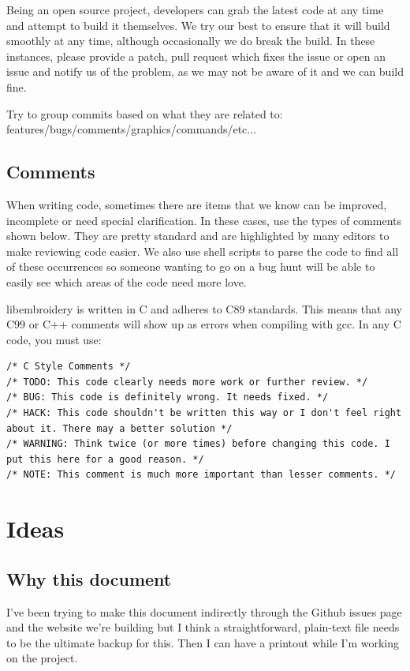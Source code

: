 \documentclass[10pt]{report}
\begin{document}
Being an open source project, developers can grab the latest code at any
time and attempt to build it themselves. We try our best to ensure that
it will build smoothly at any time, although occasionally we do break
the build. In these instances, please provide a patch, pull request
which fixes the issue or open an issue and notify us of the problem, as
we may not be aware of it and we can build fine.

Try to group commits based on what they are related to:
features/bugs/comments/graphics/commands/etc...

\subsection{Comments}

When writing code, sometimes there are items that we know can be
improved, incomplete or need special clarification. In these cases, use
the types of comments shown below. They are pretty standard and are
highlighted by many editors to make reviewing code easier. We also use
shell scripts to parse the code to find all of these occurrences so
someone wanting to go on a bug hunt will be able to easily see which
areas of the code need more love.

libembroidery is written in C and adheres to C89 standards. This means
that any C99 or C++ comments will show up as errors when compiling with
gcc. In any C code, you must use:

\begin{lstlisting}
/* C Style Comments */
/* TODO: This code clearly needs more work or further review. */
/* BUG: This code is definitely wrong. It needs fixed. */
/* HACK: This code shouldn't be written this way or I don't feel right about it. There may a better solution */
/* WARNING: Think twice (or more times) before changing this code. I put this here for a good reason. */
/* NOTE: This comment is much more important than lesser comments. */
\end{lstlisting}

\section{Ideas}

\subsection{Why this document}

I've been trying to make this document indirectly through the Github
issues page and the website we're building but I think a
straightforward, plain-text file needs to be the ultimate backup for
this. Then I can have a printout while I'm working on the project.
\end{document}
